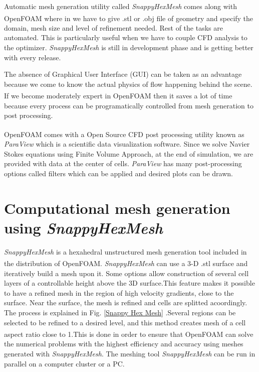 Automatic mesh generation utility called \textit{SnappyHexMesh} comes along with OpenFOAM\textsuperscript{\textregistered} where in we have to give .stl or .obj file of geometry and specify the domain, mesh size and level of refinement needed. Rest of the tasks are automated. This is particularly useful when we have to couple CFD analysis to the optimizer. \textit{SnappyHexMesh} is still in development phase and is getting better with every release.

The absence of Graphical User Interface (GUI) can be taken as an advantage because we come to know the actual physics of flow happening behind the scene. If we become moderately expert in OpenFOAM\textsuperscript{\textregistered} then it saves a lot of time because every process can be programatically controlled from mesh generation to post processing.

OpenFOAM\textsuperscript{\textregistered} comes with a Open Source CFD post processing utility known as \textit{ParaView} which is a scientific data visualization software. Since we solve Navier Stokes equations using Finite Volume Approach, at the end of simulation, we are provided with data at the center of cells. \textit{ParaView} has many post-processing options called filters which can be applied and desired plots can be drawn. 

\section{Computational mesh generation using \textit{SnappyHexMesh}}
\label{mesh}

\textit{SnappyHexMesh} is a hexahedral unstructured mesh generation tool included in the distribution of OpenFOAM\textsuperscript{\textregistered}. \textit{SnappyHexMesh} can use a 3-D .stl surface and iteratively build a mesh upon it. Some options allow construction of several cell layers of a controllable height above the 3D surface.This feature makes it possible to have a refined mesh in the region of high velocity gradients, close to the surface.  Near the surface, the mesh is refined and cells are splitted acoordingly. The process is explained in Fig. \ref{Snappy Hex Mesh} .Several regions can be selected to be refined to a desired level, and this method creates mesh of a cell aspect ratio close to 1.This is done in order to ensure that OpenFOAM\textsuperscript{\textregistered} can solve the numerical problems with the highest efficiency and accuracy using meshes generated with \textit{SnappyHexMesh}. The meshing tool \textit{SnappyHexMesh} can be run in parallel on a computer cluster or a PC.

